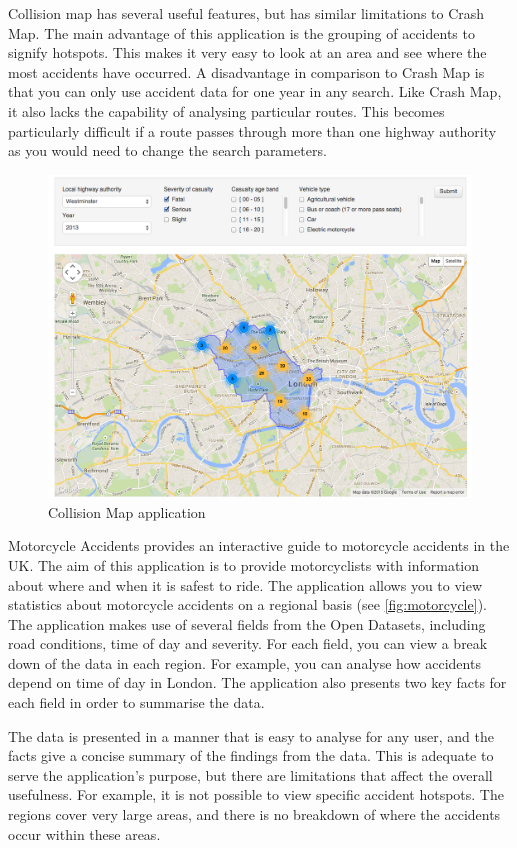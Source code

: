 \documentclass[authoryearcitations]{UoYCSproject}
\begin{document}
Collision map has several useful features, but has similar limitations to Crash Map. The main advantage of this application is the grouping of accidents to signify hotspots. This makes it very easy to look at an area and see where the most accidents have occurred. A disadvantage in comparison to Crash Map is that you can only use accident data for one year in any search. Like Crash Map, it also lacks the capability of analysing particular routes. This becomes particularly difficult if a route passes through more than one highway authority as you would need to change the search parameters. 

\begin{figure}
	\center
	\includegraphics[scale=0.3]{collisionmap}
	\caption{Collision Map application}
	\label{fig:collisionmap}
\end{figure}

Motorcycle Accidents \citep{Mceinsurance} provides an interactive guide to motorcycle accidents in the UK. The aim of this application is to provide motorcyclists with information about where and when it is safest to ride. The application allows you to view statistics about motorcycle accidents on a regional basis (see \autoref{fig:motorcycle}). The application makes use of several fields from the Open Datasets, including road conditions, time of day and severity. For each field, you can view a break down of the data in each region. For example, you can analyse how accidents depend on time of day in London. The application also presents two key facts for each field in order to summarise the data.

The data is presented in a manner that is easy to analyse for any user, and the facts give a concise summary of the findings from the data. This is adequate to serve the application's purpose, but there are limitations that affect the overall usefulness. For example, it is not possible to view specific accident hotspots. The regions cover very large areas, and there is no breakdown of where the accidents occur within these areas.
\end{document}
